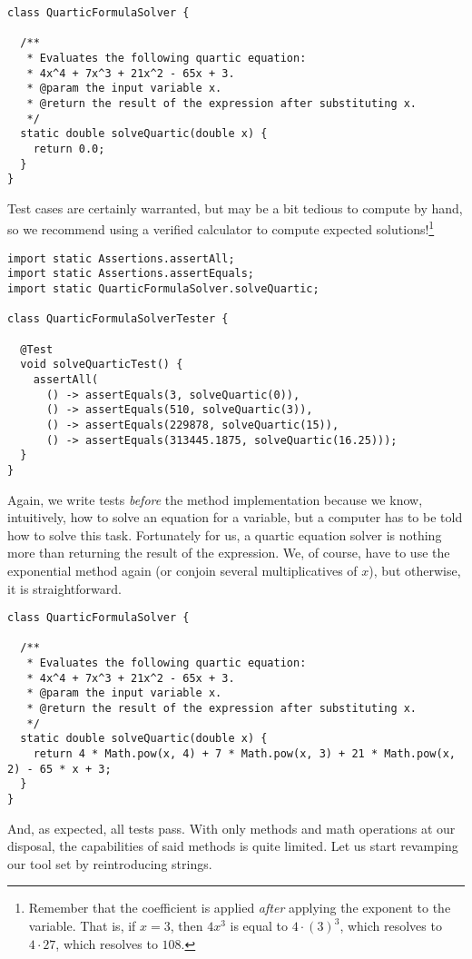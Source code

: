 \begin{cl}[]{}
\begin{lstlisting}[language=MyJava]
class QuarticFormulaSolver {

  /**
   * Evaluates the following quartic equation:
   * 4x^4 + 7x^3 + 21x^2 - 65x + 3.
   * @param the input variable x.
   * @return the result of the expression after substituting x.
   */
  static double solveQuartic(double x) {
    return 0.0;
  }
}
\end{lstlisting}
\end{cl}

Test cases are certainly warranted, but may be a bit tedious to compute by hand, so we recommend using a verified calculator to compute expected solutions!\footnote{Remember that the coefficient is applied \textit{after} applying the exponent to the variable. That is, if $x=3$, then $4x^3$ is equal to $4 \cdot (3)^3$, which resolves to $4 \cdot 27$, which resolves to $108$.}

\begin{cl}[]{}
\begin{lstlisting}[language=MyJava]
import static Assertions.assertAll;
import static Assertions.assertEquals;
import static QuarticFormulaSolver.solveQuartic;

class QuarticFormulaSolverTester {

  @Test
  void solveQuarticTest() {
    assertAll(
      () -> assertEquals(3, solveQuartic(0)),
      () -> assertEquals(510, solveQuartic(3)),
      () -> assertEquals(229878, solveQuartic(15)),
      () -> assertEquals(313445.1875, solveQuartic(16.25)));
  }
}
\end{lstlisting}
\end{cl}

Again, we write tests \textit{before} the method implementation because we know, intuitively, how to solve an equation for a variable, but a computer has to be told how to solve this task. Fortunately for us, a quartic equation solver is nothing more than returning the result of the expression. We, of course, have to use the exponential  method again (or conjoin several multiplicatives of $x$), but otherwise, it is straightforward.

\begin{cl}[]{}
\begin{lstlisting}[language=MyJava]
class QuarticFormulaSolver {

  /**
   * Evaluates the following quartic equation:
   * 4x^4 + 7x^3 + 21x^2 - 65x + 3.
   * @param the input variable x.
   * @return the result of the expression after substituting x.
   */
  static double solveQuartic(double x) {
    return 4 * Math.pow(x, 4) + 7 * Math.pow(x, 3) + 21 * Math.pow(x, 2) - 65 * x + 3;
  }
}
\end{lstlisting}
\end{cl}

And, as expected, all tests pass. With only methods and math operations at our disposal, the capabilities of said methods is quite limited. Let us start revamping our tool set by reintroducing strings.